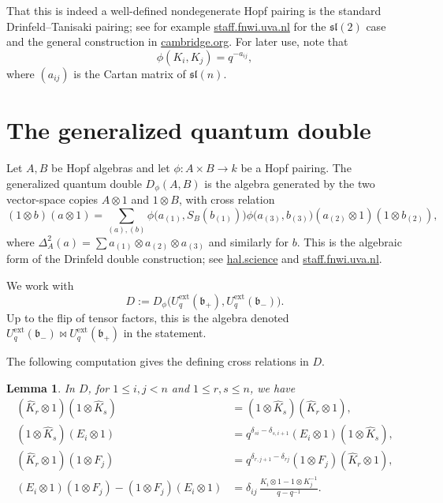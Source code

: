 \documentclass[11pt]{article}
\newtheorem{lemma}{Lemma}
\theoremstyle{definition}
\newcommand{\Uq}{U_q^{\mathrm{ext}}}
\newcommand{\slie}{\mathfrak{sl}}
\newcommand{\fb}{\mathfrak{b}}
\newcommand{\bipr}{\bowtie}
\newcommand{\KK}{\hat K}
\begin{document}
That this is indeed a well-defined nondegenerate Hopf pairing is the standard
Drinfeld--Tanisaki pairing; see for example
\href{https://staff.fnwi.uva.nl/j.v.stokman/Quantumsl2.pdf}{staff.fnwi.uva.nl}
for the $\slie(2)$ case and the general construction in
\href{https://www.cambridge.org/core/services/aop-cambridge-core/content/view/886B0B4D8E3D242A51A0380A486351EA/S0013091504000689a.pdf/presentation-by-borel-subalgebras-and-chevalley-generators-for-quantum-enveloping-algebras.pdf}{cambridge.org}.
For later use, note that
\[
\phi(K_i,K_j)=q^{-a_{ij}},
\]
where $(a_{ij})$ is the Cartan matrix of $\slie(n)$.

\section{The generalized quantum double}

Let $A,B$ be Hopf algebras and let $\phi:A\times B\to k$ be a Hopf pairing.
The generalized quantum double $D_\phi(A,B)$ is the algebra generated by the
two vector-space copies $A\otimes 1$ and $1\otimes B$, with cross relation
\begin{equation}
\label{eq:cross-general}
(1\otimes b)(a\otimes 1)
=
\sum_{(a),(b)}
\phi\bigl(a_{(1)},S_B(b_{(1)})\bigr)
\phi\bigl(a_{(3)},b_{(3)}\bigr)
(a_{(2)}\otimes 1)(1\otimes b_{(2)}),
\end{equation}
where $\Delta_A^2(a)=\sum a_{(1)}\otimes a_{(2)}\otimes a_{(3)}$ and similarly
for $b$. This is the algebraic form of the Drinfeld double construction; see
\href{https://hal.science/hal-02159493v1/file/CQG.pdf}{hal.science}
and
\href{https://staff.fnwi.uva.nl/j.v.stokman/quantumdouble2.pdf}{staff.fnwi.uva.nl}.

We work with
\[
D:=D_\phi\bigl(\Uq(\fb_+),\Uq(\fb_-)\bigr).
\]
Up to the flip of tensor factors, this is the algebra denoted
$\Uq(\fb_-)\bipr\Uq(\fb_+)$ in the statement.

The following computation gives the defining cross relations in $D$.

\begin{lemma}
\label{lem:cross}
In $D$, for $1\le i,j<n$ and $1\le r,s\le n$, we have
\begin{align}
(\KK_r\otimes 1)(1\otimes \KK_s)
&=
(1\otimes \KK_s)(\KK_r\otimes 1),
\label{eq:c0}
\\
(1\otimes \KK_s)(E_i\otimes 1)
&=
q^{\delta_{si}-\delta_{s,i+1}}
(E_i\otimes 1)(1\otimes \KK_s),
\label{eq:c1}
\\
(\KK_r\otimes 1)(1\otimes F_j)
&=
q^{\delta_{r,j+1}-\delta_{rj}}
(1\otimes F_j)(\KK_r\otimes 1),
\label{eq:c2}
\\
(E_i\otimes 1)(1\otimes F_j)
-
(1\otimes F_j)(E_i\otimes 1)
&=
\delta_{ij}\,
\frac{K_i\otimes 1-1\otimes K_j^{-1}}{q-q^{-1}}.
\label{eq:c3}
\end{align}
\end{lemma}
\end{document}
